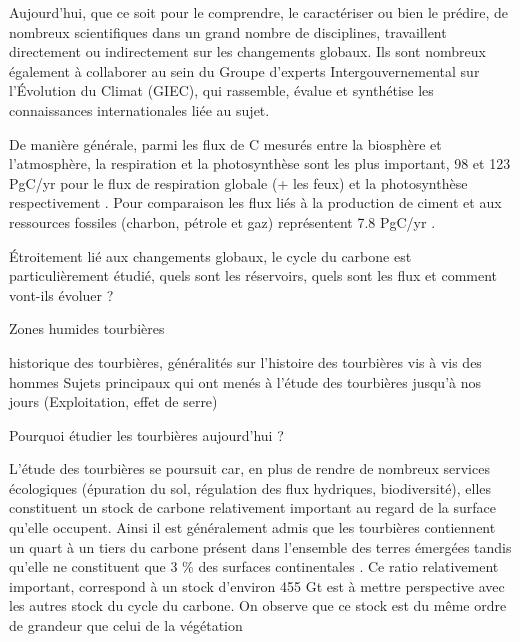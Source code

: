 \begin{linenumbers}
Aujourd'hui, que ce soit pour le comprendre, le caractériser ou bien le prédire, de nombreux  scientifiques dans un grand nombre de disciplines, travaillent directement ou indirectement sur les changements globaux.
Ils sont nombreux également à collaborer au sein du  Groupe d'experts Intergouvernemental sur l'Évolution du Climat (GIEC), qui rassemble, évalue et synthétise les connaissances internationales liée au sujet.

De manière générale, parmi les flux de C mesurés entre la biosphère et l'atmosphère, la respiration et la photosynthèse sont les plus  important, 98 et 123 PgC/yr pour le flux de respiration globale (+ les feux) et la photosynthèse respectivement \cite{Bond-Lamberty2010,Beer2010}. Pour comparaison les flux liés à la production de ciment et aux ressources fossiles (charbon, pétrole et gaz) représentent 7.8 PgC/yr \cite{Ciais2014}.

Étroitement lié aux changements globaux, le cycle du carbone est particulièrement étudié, quels sont les réservoirs, quels sont les flux et comment vont-ils évoluer ? 


Zones humides tourbières

historique des tourbières, généralités sur l'histoire des tourbières vis à vis des hommes
Sujets principaux qui ont menés à l’étude des tourbières jusqu'à nos jours (Exploitation, effet de serre)

Pourquoi étudier les tourbières aujourd’hui ? 





L'étude des tourbières se poursuit car, en plus de rendre de nombreux services écologiques  (épuration du sol, régulation des flux hydriques, biodiversité), elles constituent un stock de carbone relativement important au regard de la surface qu'elle occupent. Ainsi il est généralement admis que les tourbières contiennent un quart à un tiers du carbone présent  dans l'ensemble des terres émergées tandis qu'elle ne constituent que 3 \% des surfaces continentales \plop. Ce ratio relativement important, correspond à un stock d'environ 455 Gt \cite{Gorham1991,Turunen2002} est à mettre perspective avec les autres stock du cycle du carbone. On observe que ce stock est du même ordre de grandeur que celui de la végétation 


\end{linenumbers}
